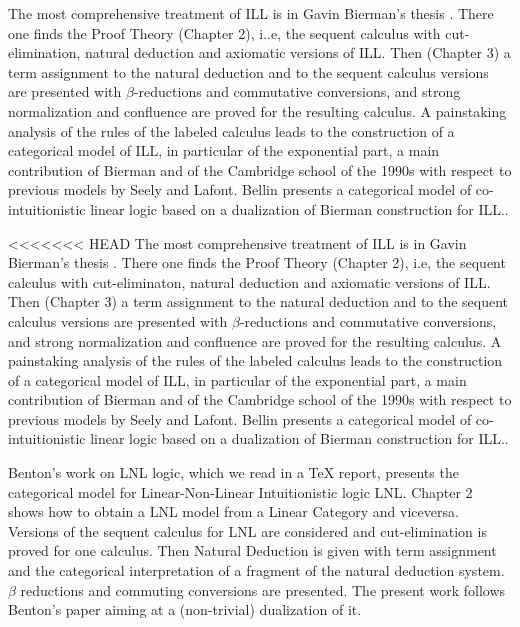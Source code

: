 The most comprehensive treatment of ILL is in Gavin Bierman's thesis
\cite{Bierman:1994}.  There one finds the Proof Theory (Chapter 2),
i..e, the sequent calculus with cut-elimination, natural deduction and
axiomatic versions of ILL. Then (Chapter 3) a term assignment to the
natural deduction and to the sequent calculus versions are presented
with $\beta$-reductions and commutative conversions, and strong
normalization and confluence are proved for the resulting calculus. A
painstaking analysis of the rules of the labeled calculus leads to
the construction of a categorical model of ILL, in particular of the
exponential part, a main contribution of Bierman and of the Cambridge
school of the 1990s with respect to previous models by Seely and
Lafont.  Bellin \cite{Bellin:2014} presents a categorical model of
co-intuitionistic linear logic based on a dualization of Bierman
\cite{Bierman:1994} construction for ILL..

<<<<<<< HEAD
The most comprehensive treatment of ILL is in Gavin Bierman's thesis  \cite{Bierman:1994}.
There one finds the Proof Theory (Chapter 2), i.e, the sequent calculus with cut-eliminaton, natural deduction and
axiomatic versions of ILL. Then (Chapter 3) a term assignment to the natural deduction and to the sequent calculus
versions are presented with $\beta$-reductions and commutative conversions, and strong normalization and confluence
are proved for the resulting calculus. A painstaking analysis of the rules of the labeled calculus leads to the construction
of a categorical model of ILL, in particular of the exponential part, a main contribution of Bierman and of the
Cambridge school of the 1990s with respect to previous models by Seely and Lafont.
Bellin \cite{Bellin:2012} presents a categorical model of co-intuitionistic linear logic based on a dualization of
Bierman \cite{Bierman:1994} construction for ILL..

Benton's work \cite{Benton:1994} on LNL logic, which we read in a TeX report, presents the categorical model 
for Linear-Non-Linear Intuitionistic logic LNL. Chapter 2 shows
how to obtain a LNL model from a Linear Category and viceversa. Versions of the sequent calculus for LNL
are considered  and cut-elimination is proved for one calculus. Then Natural Deduction is given with term
assignment and the categorical interpretation of a fragment of the natural deduction system. $\beta$ reductions
and commuting conversions are presented.
The present work follows Benton's paper aiming at a (non-trivial) dualization of it.

